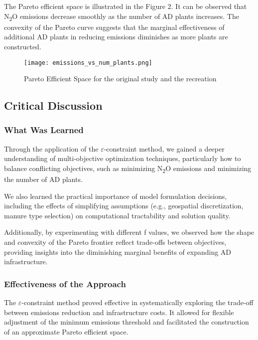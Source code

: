 \documentclass[12pt]{article}
\begin{document}
The Pareto efficient space is illustrated in the Figure 2. It can be observed that N\textsubscript{2}O emissions decrease smoothly as the number of AD plants increases. The convexity of the Pareto curve suggests that the marginal effectiveness of additional AD plants in reducing emissions diminishes as more plants are constructed.

\begin{figure}[H]
  \centering
  \texttt{[image: emissions\_vs\_num\_plants.png]}
  \caption{Pareto Efficient Space for the original study and the recreation}
  \label{fig:pareto_curve}
\end{figure}


\subsection{Critical Discussion}

\subsubsection{What Was Learned}

Through the application of the $\varepsilon$-constraint method, we gained a deeper understanding of multi-objective optimization techniques, particularly how to balance conflicting objectives, such as minimizing N\textsubscript{2}O emissions and minimizing the number of AD plants.

We also learned the practical importance of model formulation decisions, including the effects of simplifying assumptions (e.g., geospatial discretization, manure type selection) on computational tractability and solution quality.

Additionally, by experimenting with different f values, we observed how the shape and convexity of the Pareto frontier reflect trade-offs between objectives, providing insights into the diminishing marginal benefits of expanding AD infrastructure.

\subsubsection{Effectiveness of the Approach}
The $\varepsilon$-constraint method proved effective in systematically exploring the trade-off between emissions reduction and infrastructure costs. It allowed for flexible adjustment of the minimum emissions threshold and facilitated the construction of an approximate Pareto efficient space.
\end{document}
